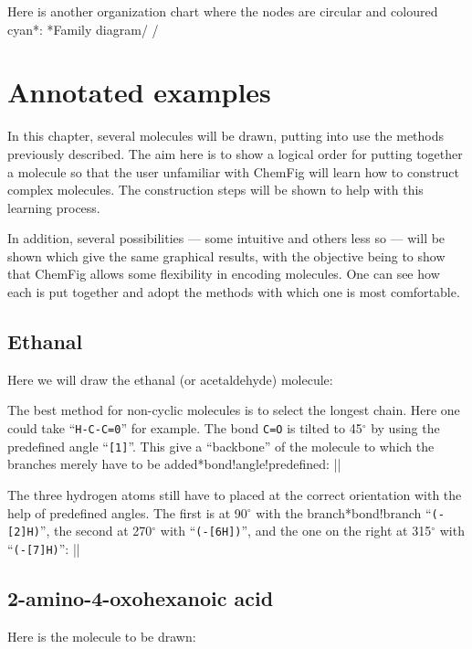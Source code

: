 \documentclass[10pt]{article}
\makeatletter
\newcommand\idx{\@ifstar{\let\print@or@not\@gobble\idx@}{\let\print@or@not\@firstofone\idx@}}
\newcommand\idx@[1]{%
	\ifcat\expandafter\noexpand\@car#1\@nil\relax%
		\expandafter\ifx\@car#1\@nil\protect
			\index{#1}%
			\print@or@not{#1}%
		\else
			\saveexpandmode\expandarg
			\StrSubstitute{\string#1}{\string @}{\@empty\protect\symbol{'100}}[\temp@]%
			\StrGobbleLeft\temp@1[\temp@]%
			\restoreexpandmode
			\expandafter\index\expandafter{\temp@ @\protect\texttt{\protect\textbackslash\temp@}}%
			\print@or@not{\texttt{\string#1}}%
		\fi
	\else
		\index{#1}%
		\print@or@not{#1}%
	\fi
}
\newcommand\make@car@active[2]{%
	\catcode`#1\active
	\begingroup
		\lccode`\~`#1\relax
		\lowercase{\endgroup\def~{#2}}%
}
\newif\if@exstar
\newcommand\exemple{%
	\begingroup
	\parskip\z@
	\@makeother\;\@makeother\!\@makeother\?\@makeother\:%
	\@ifstar{\@exstartrue\exemple@}{\@exstarfalse\exemple@}}
\newcommand\exemple@[2][65]{%
	\medbreak\noindent
	\begingroup
		\let\do\@makeother\dospecials
		\make@car@active\ { {}}%
		\make@car@active\^^M{\par\leavevmode}%
		\make@car@active\,{\leavevmode\kern\z@\string,}%
		\make@car@active\-{\leavevmode\kern\z@\string-}%
		\make@car@active\>{\leavevmode\kern\z@\string>}%
		\make@car@active\<{\leavevmode\kern\z@\string<}%
		\exemple@@{#1}{#2}%
}
\newcommand\exemple@@[3]{%
	\def\@tempa##1#3{\exemple@@@{#1}{#2}{##1}}%
	\@tempa
}
\newcommand\exemple@@@[3]{%
	\xdef\the@code{#3}%
	\endgroup
	\if@exstar
		\begingroup
			\fboxrule0.4pt
			\let\breakboxparindent\z@
			\def\bkvz@bottom{\hrule\@height\fboxrule}%
			\let\bkvz@before@breakbox\relax
			\def\bkvz@set@linewidth{\advance\linewidth\dimexpr-2\fboxrule-2\fboxsep}%
			\def\bkvz@left{\vrule\@width\fboxrule\hskip\fboxsep}%
			\def\bkvz@right{\hskip\fboxsep\vrule\@width\fboxrule}%
			\def\bkvz@top{\hbox to \hsize{%
				\vrule\@width\fboxrule\@height\fboxrule
				\leaders\bkvz@bottom\hfill
				\ECFAugie
				\fboxsep\z@
				\colorbox{black}{\kern0.25em\color{white}\footnotesize\lower0.5ex\hbox{\strut#2}\kern0.25em}%
				\leaders\bkvz@bottom\hfill
				\vrule\@width\fboxrule\@height\fboxrule}}%
			\breakbox
				\kern.5ex\relax
				\ttfamily\footnotesize\the@code\par
				\normalfont
				\kern3pt
				\hrule height0.1pt width\linewidth depth0.1pt
				\vskip5pt
				\rightskip0pt plus 1fill
				\everypar{{\color{lightgray}\rlap{\vrule height0.1pt width\linewidth depth0.1pt}}\hskip0pt plus 1fill}%
				\newlinechar`\^^M\everyeof{\noexpand}\scantokens{#3}\par
			\endbreakbox
		\endgroup
	\else
		\vskip0.5ex
		\boxput*(0,1)
			{\fboxsep\z@
			\hbox{\ECFAugie\colorbox{black}{\leavevmode\kern0.25em{\color{white}\footnotesize\strut#2}\kern0.25em}}%
			}%
			{\fboxsep5pt
			\fbox{%
				$\vcenter{\hsize\dimexpr0.#1\linewidth-\fboxsep-\fboxrule\relax
					\kern5pt\parskip0pt \ttfamily\footnotesize\the@code}%
				\vcenter{\kern5pt\hsize\dimexpr\linewidth-0.#1\linewidth-\fboxsep-\fboxrule\relax
					\everypar{{\color{lightgray}\rlap{\vrule height0.1pt width\dimexpr\linewidth-0.#1\linewidth-\fboxsep-\fboxrule depth0.1pt}}}%
					\footnotesize\newlinechar`\^^M\everyeof{\noexpand}\scantokens{#3}}$%
				}%
			}%
	\fi
	\medbreak
	\endgroup
}
\let\do\@makeother\dospecials
\def\degres{\ensuremath{{}^\circ}}
\newcommand\CF{{\ECFAugie ChemFig}\xspace}
\makeatother
\begin{document}
Here is another organization chart where the nodes are circular and coloured cyan\idx*{\printatom}:
\exemple*{Family diagram}/
\setbondoffset{0pt}
\setatomsep{80pt}
\renewcommand\printatom[1]{\textsf{#1}}
/

\section{Annotated examples}\label{exemples.commentes}
In this chapter, several molecules will be drawn, putting into use the methods previously described. The aim here is to show a logical order for putting together a molecule so that the user unfamiliar with \CF will learn how to construct complex molecules. The construction steps will be shown to help with this learning process.

In addition, several possibilities --- some intuitive and others less so --- will be shown which give the same graphical results, with the objective being to show that \CF allows some flexibility in encoding molecules. One can see how each is put together and adopt the methods with which one is most comfortable.

\subsection{Ethanal}
Here we will draw the ethanal (or acetaldehyde) molecule: 

The best method for non-cyclic molecules is to select the longest chain. Here one could take ``\verb|H-C-C=0|'' for example. The bond \verb|C=O| is tilted to 45\degres{} by using the predefined angle ``\verb-[1]-''. This give a ``backbone'' of the molecule to which the branches merely have to be added\idx*{bond!angle!predefined}:
\exemple{Backbone of ethanal}||

The three hydrogen atoms still have to placed at the correct orientation with the help of predefined angles. The first is at 90\degres{} with the branch\idx*{bond!branch} ``\verb/(-[2]H)/'', the second at 270\degres{} with ``\verb/(-[6H])/'', and the one on the right at 315\degres{} with ``\verb/(-[7]H)/'':
\exemple{Ethanal}||

\subsection{2-amino-4-oxohexanoic acid}
Here is the molecule to be drawn: 
\end{document}
